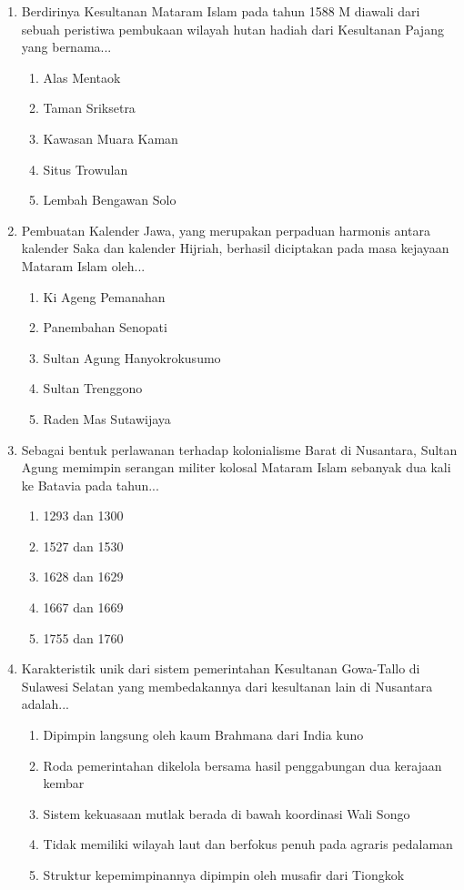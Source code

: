 \documentclass[12pt, a4paper]{article}
\begin{document}
\begin{enumerate}[label=\arabic*.]
    \item Berdirinya Kesultanan Mataram Islam pada tahun 1588 M diawali dari sebuah peristiwa pembukaan wilayah hutan hadiah dari Kesultanan Pajang yang bernama...
    \begin{enumerate}[label=\Alph*.]
        \item Alas Mentaok
        \item Taman Sriksetra
        \item Kawasan Muara Kaman
        \item Situs Trowulan
        \item Lembah Bengawan Solo
    \end{enumerate}

    \item Pembuatan Kalender Jawa, yang merupakan perpaduan harmonis antara kalender Saka dan kalender Hijriah, berhasil diciptakan pada masa kejayaan Mataram Islam oleh...
    \begin{enumerate}[label=\Alph*.]
        \item Ki Ageng Pemanahan
        \item Panembahan Senopati
        \item Sultan Agung Hanyokrokusumo
        \item Sultan Trenggono
        \item Raden Mas Sutawijaya
    \end{enumerate}

    \item Sebagai bentuk perlawanan terhadap kolonialisme Barat di Nusantara, Sultan Agung memimpin serangan militer kolosal Mataram Islam sebanyak dua kali ke Batavia pada tahun...
    \begin{enumerate}[label=\Alph*.]
        \item 1293 dan 1300
        \item 1527 dan 1530
        \item 1628 dan 1629
        \item 1667 dan 1669
        \item 1755 dan 1760
    \end{enumerate}

    \item Karakteristik unik dari sistem pemerintahan Kesultanan Gowa-Tallo di Sulawesi Selatan yang membedakannya dari kesultanan lain di Nusantara adalah...
    \begin{enumerate}[label=\Alph*.]
        \item Dipimpin langsung oleh kaum Brahmana dari India kuno
        \item Roda pemerintahan dikelola bersama hasil penggabungan dua kerajaan kembar
        \item Sistem kekuasaan mutlak berada di bawah koordinasi Wali Songo
        \item Tidak memiliki wilayah laut dan berfokus penuh pada agraris pedalaman
        \item Struktur kepemimpinannya dipimpin oleh musafir dari Tiongkok
    \end{enumerate}


\end{enumerate}
\end{document}
